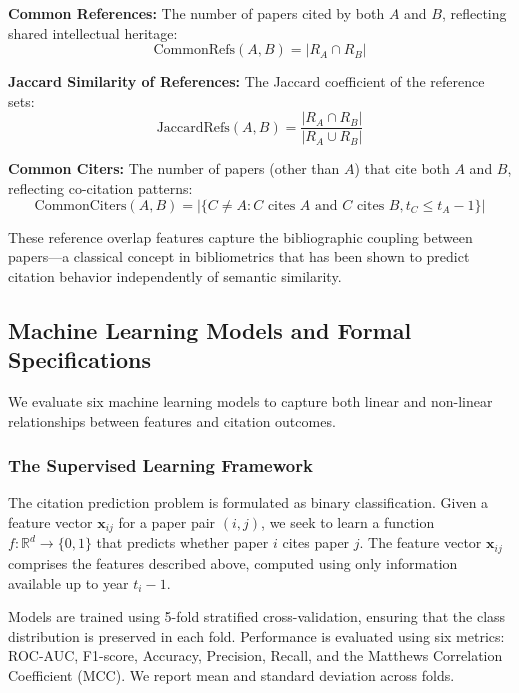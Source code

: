 \documentclass[12pt,a4paper]{article}
\begin{document}
\textbf{Common References:} The number of papers cited by both $A$ and $B$, reflecting shared intellectual heritage:
\begin{equation}
\text{CommonRefs}(A, B) = |R_A \cap R_B|
\end{equation}

\textbf{Jaccard Similarity of References:} The Jaccard coefficient of the reference sets:
\begin{equation}
\text{JaccardRefs}(A, B) = \frac{|R_A \cap R_B|}{|R_A \cup R_B|}
\end{equation}

\textbf{Common Citers:} The number of papers (other than $A$) that cite both $A$ and $B$, reflecting co-citation patterns:
\begin{equation}
\text{CommonCiters}(A, B) = |\{C \ne A : C \text{ cites } A \text{ and } C \text{ cites } B, t_C \le t_A - 1\}|
\end{equation}

These reference overlap features capture the bibliographic coupling between papers---a classical concept in bibliometrics that has been shown to predict citation behavior independently of semantic similarity.

\subsection{Machine Learning Models and Formal Specifications}

We evaluate six machine learning models to capture both linear and non-linear relationships between features and citation outcomes.

\subsubsection{The Supervised Learning Framework}

The citation prediction problem is formulated as binary classification. Given a feature vector $\mathbf{x}_{ij}$ for a paper pair $(i, j)$, we seek to learn a function $f: \mathbb{R}^d \to \{0, 1\}$ that predicts whether paper $i$ cites paper $j$. The feature vector $\mathbf{x}_{ij}$ comprises the features described above, computed using only information available up to year $t_i - 1$.

Models are trained using 5-fold stratified cross-validation, ensuring that the class distribution is preserved in each fold. Performance is evaluated using six metrics: ROC-AUC, F1-score, Accuracy, Precision, Recall, and the Matthews Correlation Coefficient (MCC). We report mean and standard deviation across folds.
\end{document}
